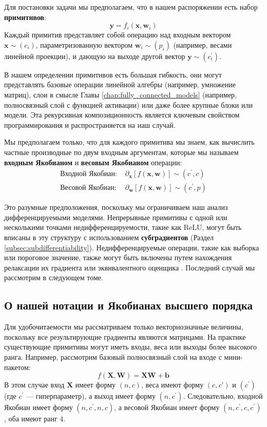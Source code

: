 Для постановки задачи мы предполагаем, что в нашем распоряжении есть набор \textbf{примитивов}:
%
$$\mathbf{y} =f_i(\mathbf{x}, \mathbf{w}_i)$$
%
Каждый примитив представляет собой операцию над входным вектором $\mathbf{x} \sim ({c_i})$, параметризованную вектором $\mathbf{w}_i \sim (p_i)$ (например, весами линейной проекции), и дающую на выходе другой вектор $\mathbf{y} \sim (c^\prime_i)$.

В нашем определении примитивов есть большая гибкость, они могут представлять базовые операции линейной алгебры (например, умножение матриц), слои в смысле Главы \ref{chap:fully_connected_models} (например, полносвязный слой с функцией активации) или даже более крупные блоки или модели. Эта рекурсивная композиционность является ключевым свойством программирования и распространяется на наш случай.

Мы предполагаем только, что для каждого примитива мы знаем, как вычислить частные производные по двум входным аргументам, которые мы называем \textbf{входным Якобианом} и \textbf{весовым Якобианом} операции:
%
\begin{eqnarray*}
\textbf{Входной Якобиан: } & \partial_{\mathbf{x}}\left[f(\mathbf{x},\mathbf{w})\right] \sim (c^\prime,c) \\
\textbf{Весовой Якобиан: } & \partial_{\mathbf{w}}\left[f(\mathbf{x},\mathbf{w})\right] \sim (c^\prime,p) 
\end{eqnarray*}

Это разумные предположения, поскольку мы ограничиваем наш анализ дифференцируемыми моделями. Непрерывные примитивы с одной или несколькими точками недифференцируемости, такие как ReLU, могут быть вписаны в эту структуру с использованием \textbf{субградиентов} (Раздел \ref{subsec:subdifferentiability}). Недифференцируемые операции, такие как выборка или пороговое значение, также могут быть включены путем нахождения релаксации их градиента или эквивалентного оценщика \cite{niculae2023discrete}. Последний случай мы рассмотрим в следующем томе.
%
\subsection*{О нашей нотации и Якобианах высшего порядка}

\addteacup Для удобочитаемости мы рассматриваем только векторнозначные величины, поскольку все результирующие градиенты являются матрицами. На практике существующие примитивы могут иметь входы, веса или выходы более высокого ранга. Например, рассмотрим базовый полносвязный слой на входе с мини-пакетом:
%
$$
f(\mathbf{X},\mathbf{W})=\mathbf{X}\mathbf{W}+\mathbf{b}
$$
%
В этом случае вход $\mathbf{X}$ имеет форму $(n,c)$, веса имеют форму $(c,c’)$ и $(c^\prime)$ (где $c^\prime$ — гиперпараметр), а выход имеет форму $(n, c^\prime)$. Следовательно, входной Якобиан имеет форму $(n,c^\prime, n, c)$, а весовой Якобиан имеет форму $(n,c^\prime, c, c^\prime)$, оба имеют ранг $4$. 

